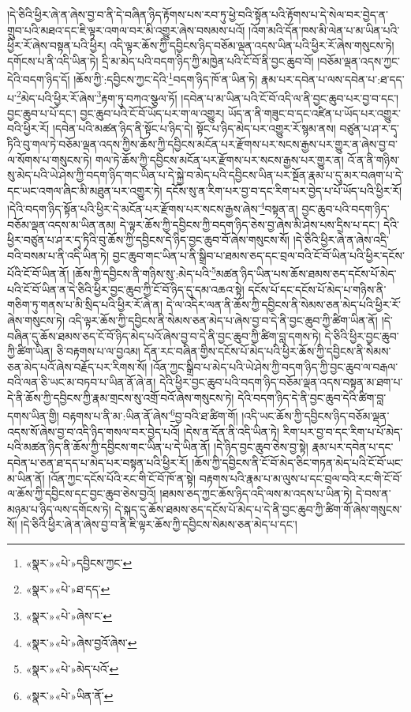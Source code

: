 །དེ་ཅིའི་ཕྱིར་ཞེ་ན་ཞེས་བྱ་བ་ནི་དེ་བཞིན་ཉིད་རྟོགས་པས་རབ་ཏུ་ཕྱེ་བའི་སྟོན་པའི་རྟོགས་པ་དེ་སེལ་བར་བྱེད་ན་གྲུབ་པའི་མཐའ་དང་ཇི་ལྟར་འགལ་བར་མི་འགྱུར་ཞེས་བསམས་པའོ། །འོག་མའི་དོན་ཁས་མི་ལེན་པ་མ་ཡིན་པའི་ཕྱིར་རོ་ཞེས་བསྟན་པའི་ཕྱིར། འདི་ལྟར་ཆོས་ཀྱི་དབྱིངས་ཉིད་བཅོམ་ལྡན་འདས་ཡིན་པའི་ཕྱིར་རོ་ཞེས་གསུངས་ཏེ། དགོངས་པ་ནི་འདི་ཡིན་ཏེ། དྲི་མ་མེད་པའི་བདག་ཉིད་ཀྱི་མཁྱེན་པའི་ངོ་བོ་ནི་བྱང་ཆུབ་བོ། །བཅོམ་ལྡན་འདས་ཀྱང་དེའི་བདག་ཉིད་དོ། །ཆོས་ཀྱི་:དབྱིངས་ཀྱང་དེའི་\footnote{«སྣར་»«པེ་»དབྱིངས་ཀྱང་}བདག་ཉིད་ཁོ་ན་ཡིན་ཏེ། རྣམ་པར་དབེན་པ་ལས་དབེན་པ་:ཐ་དད་པ་\footnote{«སྣར་»«པེ་»ཐ་དད་}མེད་པའི་ཕྱིར་རོ་ཞེས་\footnote{«སྣར་»«པེ་»ཞེས་ང་}རྟག་ཏུ་བཀའ་སྩལ་ཏོ། །དབེན་པ་མ་ཡིན་པའི་ངོ་བོ་འདི་ལ་ནི་བྱང་ཆུབ་པར་བྱ་བ་དང་། བྱང་ཆུབ་པ་པོ་དང་། བྱང་ཆུབ་པའི་ངོ་བོ་ཡོད་པར་ག་ལ་འགྱུར། ཡོད་ན་ནི་གཟུང་བ་དང་འཛིན་པ་ཡོད་པར་འགྱུར་བའི་ཕྱིར་རོ། །དབེན་པའི་མཚན་ཉིད་ནི་སྟོང་པ་ཉིད་དེ། སྟོང་པ་ཉིད་མེད་པར་འགྱུར་རོ་སྙམ་ནས། བཙུན་པ་ཤ་ར་དྭ་ཏིའི་བུ་གལ་ཏེ་བཅོམ་ལྡན་འདས་ཀྱིས་ཆོས་ཀྱི་དབྱིངས་མངོན་པར་རྫོགས་པར་སངས་རྒྱས་པར་གྱུར་ན་ཞེས་བྱ་བ་ལ་སོགས་པ་གསུངས་ཏེ། གལ་ཏེ་ཆོས་ཀྱི་དབྱིངས་མངོན་པར་རྫོགས་པར་སངས་རྒྱས་པར་གྱུར་ན། འོ་ན་ནི་གཉིས་སུ་མེད་པའི་ཡེ་ཤེས་ཀྱི་བདག་ཉིད་གང་ཡིན་པ་དེ་སྐྱེ་བ་མེད་པའི་དབྱིངས་ཡིན་པར་སྔོན་རྣམ་པ་དུ་མར་བཞག་པ་དེ་དང་ཡང་འགལ་ཞིང་མི་མཐུན་པར་འགྱུར་ཏེ། དངོས་སུ་ན་རིག་པར་བྱ་བ་དང་རིག་པར་བྱེད་པ་པོ་ཡོད་པའི་ཕྱིར་རོ། །དེའི་བདག་ཉིད་སྟོན་པའི་ཕྱིར་དེ་མངོན་པར་རྫོགས་པར་སངས་རྒྱས་ཞེས་\footnote{«སྣར་»«པེ་»ཞེས་བྱའོ་ཞེས་}བསྟན་ན། བྱང་ཆུབ་པའི་བདག་ཉིད་བཅོམ་ལྡན་འདས་མ་ཡིན་ནམ། དེ་ལྟར་ཆོས་ཀྱི་དབྱིངས་ཀྱི་བདག་ཉིད་ཅེས་བྱ་ཞེས་མི་ཤེས་པས་དྲིས་པ་དང་། དེའི་ཕྱིར་བཙུན་པ་ཤ་ར་དྭ་ཏིའི་བུ་ཆོས་ཀྱི་དབྱིངས་དེ་ཉིད་བྱང་ཆུབ་བོ་ཞེས་གསུངས་སོ། །དེ་ཅིའི་ཕྱིར་ཞེ་ན་ཞེས་འདྲི་བའི་བསམ་པ་ནི་འདི་ཡིན་ཏེ། བྱང་ཆུབ་གང་ཡིན་པ་ནི་སྒྲིབ་པ་ཐམས་ཅད་དང་བྲལ་བའི་ངོ་བོ་ཡིན་པའི་ཕྱིར་དངོས་པོའི་ངོ་བོ་ཡིན་ནོ། །ཆོས་ཀྱི་དབྱིངས་ནི་གཉིས་སུ་:མེད་པའི་\footnote{«སྣར་»«པེ་»མེད་པའོ་}མཚན་ཉིད་ཡིན་པས་ཆོས་ཐམས་ཅད་དངོས་པོ་མེད་པའི་ངོ་བོ་ཡིན་ན་དེ་ཅིའི་ཕྱིར་བྱང་ཆུབ་ཀྱི་ངོ་བོ་ཉིད་དུ་དམ་འཆའ་སྟེ། དངོས་པོ་དང་དངོས་པོ་མེད་པ་གཉིས་ནི་གཅིག་ཏུ་གནས་པ་མི་སྲིད་པའི་ཕྱིར་རོ་ཞེ་ན། དེ་ལ་འདིར་ལན་ནི་ཆོས་ཀྱི་དབྱིངས་ནི་སེམས་ཅན་མེད་པའི་ཕྱིར་རོ་ཞེས་གསུངས་ཏེ། འདི་ལྟར་ཆོས་ཀྱི་དབྱིངས་ནི་སེམས་ཅན་མེད་པ་ཞེས་བྱ་བ་དེ་ནི་བྱང་ཆུབ་ཀྱི་ཚིག་ཡིན་ནོ། །དེ་བཞིན་དུ་ཆོས་ཐམས་ཅད་ངོ་བོ་ཉིད་མེད་པའོ་ཞེས་བྱ་བ་དེ་ནི་བྱང་ཆུབ་ཀྱི་ཚིག་བླ་དགས་ཏེ། དེ་ཅིའི་ཕྱིར་བྱང་ཆུབ་ཀྱི་ཚིག་ཡིན། ཅི་བརྟགས་པ་ལ་བྱའམ། དོན་རང་བཞིན་གྱིས་དངོས་པོ་མེད་པའི་ཕྱིར་ཆོས་ཀྱི་དབྱིངས་ནི་སེམས་ཅན་མེད་པའོ་ཞེས་བརྗོད་པར་རིགས་སོ། །འོན་ཀྱང་སྒྲིབ་པ་མེད་པའི་ཡེ་ཤེས་ཀྱི་བདག་ཉིད་ཀྱི་བྱང་ཆུབ་ལ་བརྒལ་བའི་ལན་ཅི་ཡང་མ་བཏབ་པ་ཡིན་ནོ་ཞེ་ན། དེའི་ཕྱིར་བྱང་ཆུབ་པའི་བདག་ཉིད་བཅོམ་ལྡན་འདས་བསྟན་མ་ཐག་པ་དེ་ནི་ཆོས་ཀྱི་དབྱིངས་ཀྱི་རྣམ་གྲངས་སུ་འགྲོ་བའོ་ཞེས་གསུངས་ཏེ། དེའི་བདག་ཉིད་དེ་ནི་བྱང་ཆུབ་དེའི་ཚིག་བླ་དགས་ཡིན་གྱི། བརྟགས་པ་ནི་མ་:ཡིན་ནོ་ཞེས་\footnote{«སྣར་»«པེ་»ཡིན་ནོ་}བྱ་བའི་ཐ་ཚིག་གོ། །འདི་ཡང་ཆོས་ཀྱི་དབྱིངས་ཉིད་བཅོམ་ལྡན་འདས་སོ་ཞེས་བྱ་བ་འདི་ཉིད་གསལ་བར་བྱེད་པའོ། །དེས་ན་དོན་ནི་འདི་ཡིན་ཏེ། རིག་པར་བྱ་བ་དང་རིག་པ་པོ་མེད་པའི་མཚན་ཉིད་ནི་ཆོས་ཀྱི་དབྱིངས་གང་ཡིན་པ་དེ་ཡིན་ནོ། །དེ་ཉིད་བྱང་ཆུབ་ཅེས་བྱ་སྟེ། རྣམ་པར་དབེན་པ་དང་དབེན་པ་ཅན་ཐ་དད་པ་མེད་པར་བསྟན་པའི་ཕྱིར་རོ། །ཆོས་ཀྱི་དབྱིངས་ནི་ངོ་བོ་མེད་ཅིང་གཏན་མེད་པའི་ངོ་བོ་ཡང་མ་ཡིན་ནོ། །འོན་ཀྱང་དངོས་པོའི་རང་གི་ངོ་བོ་ཁོ་ན་སྟེ། བརྟགས་པའི་རྣམ་པ་མ་ལུས་པ་དང་བྲལ་བའི་རང་གི་ངོ་བོ་ལ་ཆོས་ཀྱི་དབྱིངས་དང་བྱང་ཆུབ་ཅེས་བྱའོ། །ཐམས་ཅད་ཀྱང་ཆོས་ཉིད་འདི་ལས་མ་འདས་པ་ཡིན་ཏེ། དེ་བས་ན་མཉམ་པ་ཉིད་ལས་དགོངས་ཏེ། དེ་སྐད་དུ་ཆོས་ཐམས་ཅད་དངོས་པོ་མེད་པ་དེ་ནི་བྱང་ཆུབ་ཀྱི་ཚིག་གོ་ཞེས་གསུངས་སོ། །དེ་ཅིའི་ཕྱིར་ཞེ་ན་ཞེས་བྱ་བ་ནི་ཇི་ལྟར་ཆོས་ཀྱི་དབྱིངས་སེམས་ཅན་མེད་པ་དང་། 